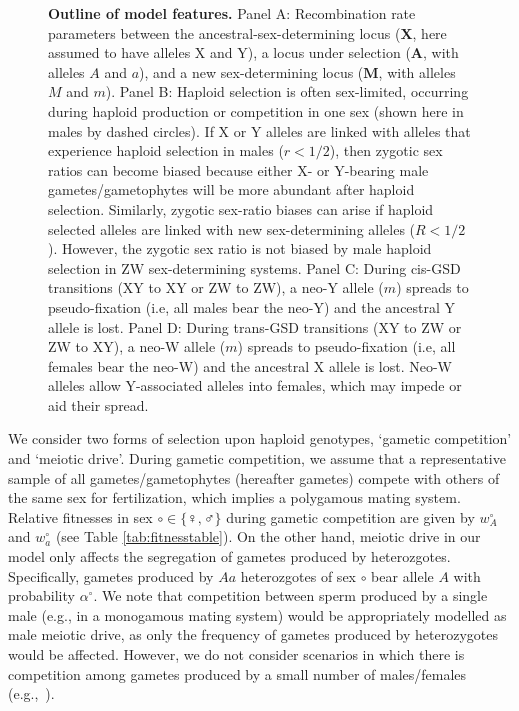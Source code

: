 \documentclass[10pt,letterpaper]{article}
\begin{document}
\begin{figure}[!h]
\caption{
{\bf Outline of model features.}
Panel A: Recombination rate parameters between the ancestral-sex-determining locus ($\mathbf{X}$, here assumed to have alleles X and Y), a locus under selection ($\mathbf{A}$, with alleles $A$ and $a$), and a new sex-determining locus ($\mathbf{M}$, with alleles $M$ and $m$). 
Panel B: Haploid selection is often sex-limited, occurring during haploid production or competition in one sex (shown here in males by dashed circles). 
If X or Y alleles are linked with alleles that experience haploid selection in males ($r<1/2$), then zygotic sex ratios can become biased because either X- or Y-bearing male gametes/gametophytes will be more abundant after haploid selection. 
Similarly, zygotic sex-ratio biases can arise if haploid selected alleles are linked with new sex-determining alleles ($R<1/2$). 
However, the zygotic sex ratio is not biased by male haploid selection in ZW sex-determining systems. 
Panel C: During cis-GSD transitions (XY to XY or ZW to ZW), a neo-Y allele ($m$) spreads to pseudo-fixation (i.e, all males bear the neo-Y) and the ancestral Y allele is lost. 
Panel D: During trans-GSD transitions (XY to ZW or ZW to XY), a neo-W allele ($m$) spreads to pseudo-fixation (i.e, all females bear the neo-W) and the ancestral X allele is lost. 
Neo-W alleles allow Y-associated alleles into females, which may impede or aid their spread. 
}
\label{fig:model_outline}
\end{figure}

We consider two forms of selection upon haploid genotypes, `gametic competition' and `meiotic drive'. 
During gametic competition, we assume that a representative sample of all gametes/gametophytes (hereafter gametes) compete with others of the same sex for fertilization, which implies a polygamous mating system. 
Relative fitnesses in sex $\circ \in \{\female,\male\}$ during gametic competition are given by $w_A^\circ$ and $w_a^\circ$ (see Table \ref{tab:fitnesstable}).
On the other hand, meiotic drive in our model only affects the segregation of gametes produced by heterozgotes.
Specifically, gametes produced by $Aa$ heterozgotes of sex $\circ$ bear allele $A$ with probability $\alpha^\circ$. 
We note that competition between sperm produced by a single male (e.g., in a monogamous mating system) would be appropriately modelled as male meiotic drive, as only the frequency of gametes produced by heterozygotes would be affected. 
However, we do not consider scenarios in which there is competition among gametes produced by a small number of males/females (e.g.,~\cite{Holman:2015en}).
\end{document}
